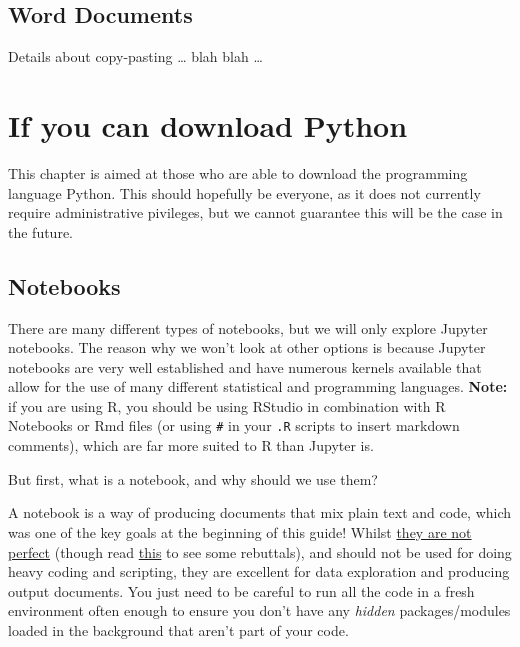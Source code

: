 \documentclass[]{book}
\begin{document}
\hypertarget{word-documents}{%
\section{Word Documents}\label{word-documents}}

Details about copy-pasting \ldots{} blah blah \ldots{}

\hypertarget{if-you-can-download-python}{%
\chapter{If you can download Python}\label{if-you-can-download-python}}

This chapter is aimed at those who are able to download the programming language Python. This should hopefully be everyone, as it does not currently require administrative pivileges, but we cannot guarantee this will be the case in the future.

\hypertarget{notebooks}{%
\section{Notebooks}\label{notebooks}}

There are many different types of notebooks, but we will only explore Jupyter notebooks. The reason why we won't look at other options is because Jupyter notebooks are very well established and have numerous kernels available that allow for the use of many different statistical and programming languages. \textbf{Note:} if you are using R, you should be using RStudio in combination with R Notebooks or Rmd files (or using \texttt{\#\textquotesingle{}} in your \texttt{.R} scripts to insert markdown comments), which are far more suited to R than Jupyter is.

But first, what is a notebook, and why should we use them?

A notebook is a way of producing documents that mix plain text and code, which was one of the key goals at the beginning of this guide! Whilst \href{https://docs.google.com/presentation/d/1n2RlMdmv1p25Xy5thJUhkKGvjtV-dkAIsUXP-AL4ffI/edit\#slide=id.g3a428e2eb8_0_305}{they are not perfect} (though read \href{https://yihui.name/en/2018/09/notebook-war/}{this} to see some rebuttals), and should not be used for doing heavy coding and scripting, they are excellent for data exploration and producing output documents. You just need to be careful to run all the code in a fresh environment often enough to ensure you don't have any \emph{hidden} packages/modules loaded in the background that aren't part of your code.
\end{document}
